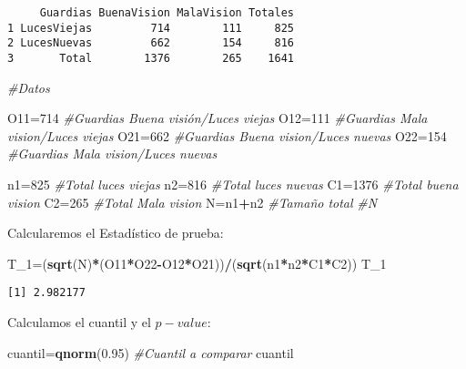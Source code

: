 \documentclass[
  a4paper,
  oneside,
  openany]{book}
\newenvironment{Shaded}{\begin{snugshade}}{\end{snugshade}}
\newcommand{\CommentTok}[1]{\textcolor[rgb]{0.56,0.35,0.01}{\textit{#1}}}
\newcommand{\DecValTok}[1]{\textcolor[rgb]{0.00,0.00,0.81}{#1}}
\newcommand{\FloatTok}[1]{\textcolor[rgb]{0.00,0.00,0.81}{#1}}
\newcommand{\FunctionTok}[1]{\textcolor[rgb]{0.13,0.29,0.53}{\textbf{#1}}}
\newcommand{\NormalTok}[1]{#1}
\newcommand{\OtherTok}[1]{\textcolor[rgb]{0.56,0.35,0.01}{#1}}
\newcommand{\SpecialCharTok}[1]{\textcolor[rgb]{0.81,0.36,0.00}{\textbf{#1}}}
\begin{document}
\begin{verbatim}
     Guardias BuenaVision MalaVision Totales
1 LucesViejas         714        111     825
2 LucesNuevas         662        154     816
3       Total        1376        265    1641
\end{verbatim}

\begin{Shaded}
\begin{Highlighting}[]
\CommentTok{\#Datos}

\NormalTok{O11}\OtherTok{=}\DecValTok{714}    \CommentTok{\#Guardias Buena visión/Luces viejas}
\NormalTok{O12}\OtherTok{=}\DecValTok{111}    \CommentTok{\#Guardias Mala vision/Luces viejas}
\NormalTok{O21}\OtherTok{=}\DecValTok{662}    \CommentTok{\#Guardias Buena vision/Luces nuevas}
\NormalTok{O22}\OtherTok{=}\DecValTok{154}    \CommentTok{\#Guardias Mala vision/Luces nuevas}

\NormalTok{n1}\OtherTok{=}\DecValTok{825}      \CommentTok{\#Total luces viejas         }
\NormalTok{n2}\OtherTok{=}\DecValTok{816}      \CommentTok{\#Total luces nuevas}
\NormalTok{C1}\OtherTok{=}\DecValTok{1376}     \CommentTok{\#Total buena vision}
\NormalTok{C2}\OtherTok{=}\DecValTok{265}      \CommentTok{\#Total Mala vision}
\NormalTok{N}\OtherTok{=}\NormalTok{n1}\SpecialCharTok{+}\NormalTok{n2     }\CommentTok{\#Tamaño total }
\CommentTok{\#N}
\end{Highlighting}
\end{Shaded}

Calcularemos el Estadístico de prueba:

\begin{Shaded}
\begin{Highlighting}[]
\NormalTok{T\_1}\OtherTok{=}\NormalTok{(}\FunctionTok{sqrt}\NormalTok{(N)}\SpecialCharTok{*}\NormalTok{(O11}\SpecialCharTok{*}\NormalTok{O22}\SpecialCharTok{{-}}\NormalTok{O12}\SpecialCharTok{*}\NormalTok{O21))}\SpecialCharTok{/}\NormalTok{(}\FunctionTok{sqrt}\NormalTok{(n1}\SpecialCharTok{*}\NormalTok{n2}\SpecialCharTok{*}\NormalTok{C1}\SpecialCharTok{*}\NormalTok{C2))}
\NormalTok{T\_1}
\end{Highlighting}
\end{Shaded}

\begin{verbatim}
[1] 2.982177
\end{verbatim}

Calculamos el cuantil y el \(p-value\):

\begin{Shaded}
\begin{Highlighting}[]
\NormalTok{cuantil}\OtherTok{=}\FunctionTok{qnorm}\NormalTok{(}\FloatTok{0.95}\NormalTok{)  }\CommentTok{\#Cuantil a comparar}
\NormalTok{cuantil}
\end{Highlighting}
\end{Shaded}
\end{document}
